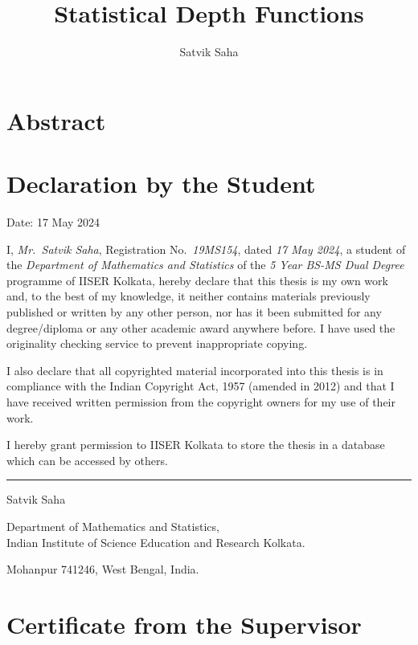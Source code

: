 \documentclass[12pt]{report}
\title{Statistical Depth Functions}
\author{Satvik Saha}
\date{}
\begin{document}
    


    \chapter*{Abstract}




    \chapter*{Declaration by the Student}

    Date: 17 May 2024

    I, \textit{Mr.~Satvik Saha}, Registration No.~\textit{19MS154}, dated
    \textit{17 May 2024}, a student of the \textit{Department of Mathematics
    and Statistics} of the \textit{5 Year BS-MS Dual Degree} programme of
    IISER Kolkata, hereby declare that this thesis is my own work and, to the
    best of my knowledge, it neither contains materials previously published
    or written by any other person, nor has it been submitted for any
    degree/diploma or any other academic award anywhere before.
    I have used the originality checking service to prevent inappropriate
    copying.

    I also declare that all copyrighted material incorporated into this thesis
    is in compliance with the Indian Copyright Act, 1957 (amended in 2012) and
    that I have received written permission from the copyright owners for my
    use of their work.

    I hereby grant permission to IISER Kolkata to store the thesis in a
    database which can be accessed by others.


    \vspace{5em}
    \rule{0.4\textwidth}{0.8pt}

    \vspace{0.1em}
    Satvik Saha

    Department of Mathematics and Statistics,\\
    Indian Institute of Science Education and Research Kolkata.

    Mohanpur 741246, West Bengal, India.

    \chapter*{Certificate from the Supervisor}
\end{document}
